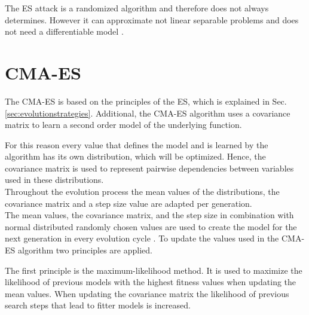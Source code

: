 The \ac{ES} attack is a randomized algorithm and therefore does not always determines.
However it can approximate not linear separable problems and does not need a differentiable model \cite{Ruhrmair2010ModelingFunctions}.
	

\section{CMA-ES}
\label{sec:cma-es}

The \acf{CMA-ES} is based on the principles of the \ac{ES}, which is explained in Sec. \ref{sec:evolutionstrategies}.
Additional, the \ac{CMA-ES} algorithm uses a covariance matrix to learn a second order model of the underlying function.

For this reason every value that defines the model and is learned by the algorithm has its own distribution, which will be optimized.
Hence, the covariance matrix is used to represent pairwise dependencies between variables used in these distributions.\\
Throughout the evolution process the mean values of the distributions, the covariance matrix and a step size value are adapted per generation.\\
The mean values, the covariance matrix, and the step size in combination with normal distributed randomly chosen values are used to create the model for the next generation in every evolution cycle \cite{2017CMA-ES}.
To update the values used in the \ac{CMA-ES} algorithm two principles are applied.

The first principle is the maximum-likelihood method.
It is used to maximize the likelihood of previous models with the highest fitness values when updating the mean values.
When updating the covariance matrix the likelihood of previous search steps that lead to fitter models is increased.

